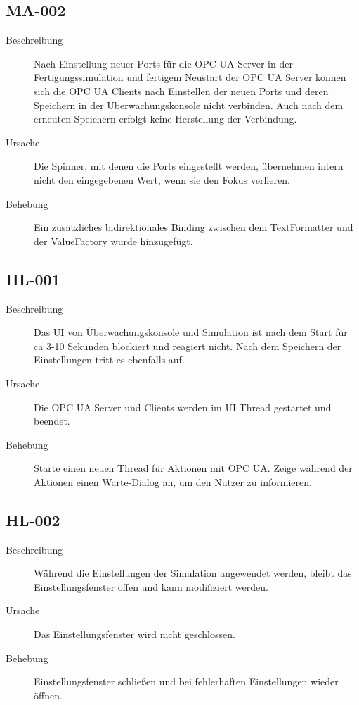 \documentclass[parskip=full]{scrartcl}
\begin{document}
\subsection{MA-002}
\begin{description}
	\item[Beschreibung] Nach Einstellung neuer Ports für die OPC UA Server in der Fertigungssimulation und fertigem Neustart der OPC UA Server können sich die OPC UA Clients nach Einstellen der neuen Ports und deren Speichern in der Überwachungskonsole nicht verbinden. Auch nach dem erneuten Speichern erfolgt keine Herstellung der Verbindung.
	\item[Ursache] Die Spinner, mit denen die Ports eingestellt werden, übernehmen intern nicht den eingegebenen Wert, wenn sie den Fokus verlieren.
	\item[Behebung] Ein zusätzliches bidirektionales Binding zwischen dem TextFormatter und der ValueFactory wurde hinzugefügt.
\end{description}

\subsection{HL-001}
\begin{description}
	\item[Beschreibung] Das UI von Überwachungskonsole und Simulation ist nach dem Start für ca 3-10 Sekunden blockiert und reagiert nicht. Nach dem Speichern der Einstellungen tritt es ebenfalls auf.
	\item[Ursache] Die OPC UA Server und Clients werden im UI Thread gestartet und beendet.
	\item[Behebung] Starte einen neuen Thread für Aktionen mit OPC UA. Zeige während der Aktionen einen Warte-Dialog an, um den Nutzer zu informieren.
\end{description}

\subsection{HL-002}
\begin{description}
	\item[Beschreibung] Während die Einstellungen der Simulation angewendet werden, bleibt das Einstellungsfenster offen und kann modifiziert werden.
	\item[Ursache] Das Einstellungsfenster wird nicht geschlossen.
	\item[Behebung] Einstellungsfenster schließen und bei fehlerhaften Einstellungen wieder öffnen.
\end{description}
\end{document}
